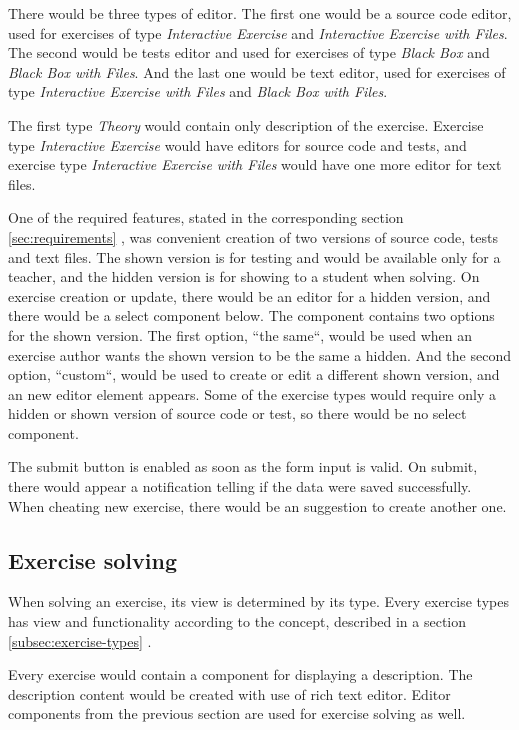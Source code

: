     There would be three types of editor. The first one would be a source code editor, used for exercises of type \textit{Interactive Exercise} and \textit{Interactive Exercise with Files}. The second would be tests editor and used for exercises of type \textit{Black Box} and \textit{Black Box with Files}. And the last one would be text editor, used for exercises of type \textit{Interactive Exercise with Files} and \textit{Black Box with Files}.
    
    The first type \textit{Theory} would contain only description of the exercise. Exercise type \textit{Interactive Exercise} would have editors for source code and tests, and exercise type \textit{Interactive Exercise with Files} would have one more editor for text files.
    
    One of the required features, stated in the corresponding section \ref{sec:requirements} , was convenient creation of two versions of source code, tests and text files. The shown version is for testing and would be available only for a teacher, and the hidden version is for showing to a student when solving. On exercise creation or update, there would be an editor for a hidden version, and there would be a select component below. The component contains two options for the shown version. The first option, ``the same``, would be used when an exercise author wants the shown version to be the same a hidden. And the second option, ``custom``, would be used to create or edit a different shown version, and an new editor element appears. Some of the exercise types would require only a hidden or shown version of source code or test, so there would be no select component.
    
    The submit button is enabled as soon as the form input is valid. On submit, there would appear a notification telling if the data were saved successfully. When cheating new exercise, there would be an suggestion to create another one.
    
    
    \subsection{Exercise solving}
    When solving an exercise, its view is determined by its type. Every exercise types has view and functionality according to the concept, described in a section \ref{subsec:exercise-types} .
    
    Every exercise would contain a component for displaying a description. The description content would be created with use of rich text editor. Editor components from the previous section are used for exercise solving as well.
    
